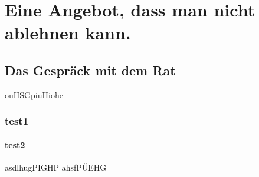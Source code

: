\documentclass{include/pnp}
\begin{document}

	

	
	
	\TableOfContents
	

	\MainMatter

	\chapter[Im Ratshaus]{Eine Angebot, dass man nicht ablehnen kann.}
	\section{Das Gespräck mit dem Rat}
	ouHSGpiuHiohe
	\subsection{test1}
	\subsubsection{test2}
	asdlhugPIGHP
	\newpage
	ahsfPÜEHG
\end{document}
